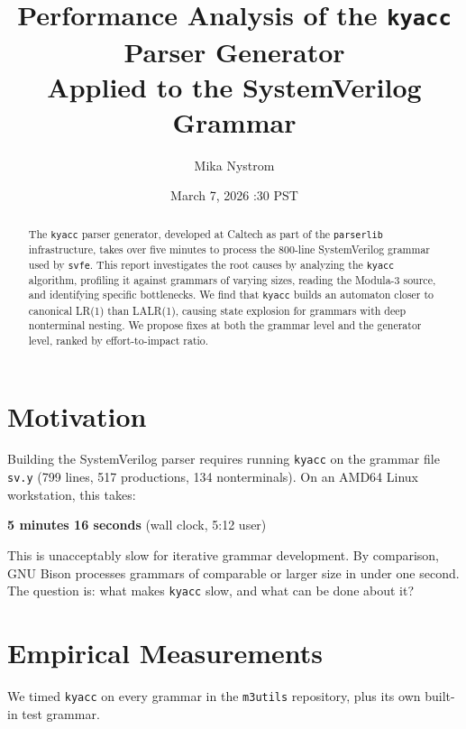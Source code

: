 \documentclass[11pt]{article}
\title{Performance Analysis of the \texttt{kyacc} Parser Generator\\[4pt]
       \large Applied to the SystemVerilog Grammar}
\author{Mika Nystrom}
\date{March 7, 2026 \quad 10:30 PST}
\begin{document}
\maketitle

\begin{abstract}
The \texttt{kyacc} parser generator, developed at Caltech as part of
the \texttt{parserlib} infrastructure, takes over five minutes to
process the 800-line SystemVerilog grammar used by \texttt{svfe}.
This report investigates the root causes by analyzing the
\texttt{kyacc} algorithm, profiling it against grammars of varying
sizes, reading the Modula-3 source, and identifying specific
bottlenecks.  We find that \texttt{kyacc} builds an automaton closer
to canonical LR(1) than LALR(1), causing state explosion for grammars
with deep nonterminal nesting.  We propose fixes at both the grammar
level and the generator level, ranked by effort-to-impact ratio.
\end{abstract}

\tableofcontents
\newpage

\section{Motivation}

Building the SystemVerilog parser requires running \texttt{kyacc} on
the grammar file \texttt{sv.y} (799 lines, 517 productions, 134
nonterminals).  On an AMD64 Linux workstation, this takes:

\begin{center}
\textbf{5 minutes 16 seconds} (wall clock, 5:12 user)
\end{center}

This is unacceptably slow for iterative grammar development.  By
comparison, GNU Bison processes grammars of comparable or larger size
in under one second.  The question is: what makes \texttt{kyacc} slow,
and what can be done about it?

\section{Empirical Measurements}

We timed \texttt{kyacc} on every grammar in the \texttt{m3utils}
repository, plus its own built-in test grammar.
\end{document}
